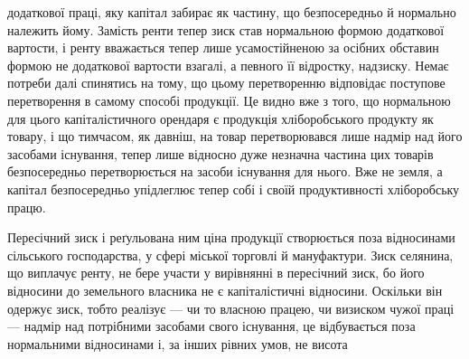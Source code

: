 додаткової праці, яку капітал забирає як частину, що безпосередньо й нормально
належить йому. Замість ренти тепер зиск став нормальною формою додаткової
вартости, і ренту вважається тепер лише усамостійненою за осібних
обставин формою не додаткової вартости взагалі, а певного її відростку, надзиску.
Немає потреби далі спинятись на тому, що цьому перетворенню відповідає
поступове перетворення в самому способі продукції. Це видно вже з того,
що нормальною для цього капіталістичного орендаря є продукція хліборобського
продукту як товару, і що тимчасом, як давніш, на товар перетворювався лише
надмір над його засобами існування, тепер лише відносно дуже незначна частина
цих товарів безпосередньо перетворюється на засоби існування для нього.
Вже не земля, а капітал безпосередньо упідлеглює тепер собі і своїй продуктивності
хліборобську працю.

Пересічний зиск і реґульована ним ціна продукції створюється поза відносинами
сільського господарства, у сфері міської торговлі й мануфактури. Зиск
селянина, що виплачує ренту, не бере участи у вирівнянні в пересічний зиск,
бо його відносини до земельного власника не є капіталістичні відносини.
Оскільки він одержує зиск, тобто реалізує — чи то власною працею, чи визиском
чужої праці — надмір над потрібними засобами свого існування, це відбувається
поза нормальними відносинами і, за інших рівних умов, не висота
\parbreak{}  %
